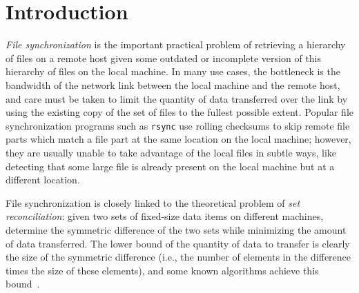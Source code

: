 \documentclass[twoside,envcountsame,runningheads]{llncs}
\newcommand{\rsync}{\texttt{rsync}\xspace}
\begin{document}

\section{Introduction}

\emph{File synchronization} is the important practical problem of
retrieving a hierarchy of files on a remote host given some outdated or
incomplete version of this hierarchy of files on the local machine. In many use
cases, the bottleneck is the bandwidth of the network link between the local machine
and the remote host, and care must be taken to limit the quantity of data
transferred over the link by using the existing copy of the set of files to the
fullest possible extent. Popular file synchronization programs such as \rsync
use rolling checksums to skip remote file parts which match a file part at the
same location on the local machine; however, they are usually unable to take
advantage of the local files in subtle ways, like detecting that some large file
is already present on the local machine but at a different location.

File synchronization is closely linked to the theoretical problem of \emph{set
reconciliation}: given two sets of fixed-size data items on different machines,
determine the symmetric difference of the two sets while minimizing the amount
of data transferred. The lower bound of the quantity of data to transfer is
clearly the size of the symmetric difference (i.e., the number of elements in the
difference times the size of these elements), and some known algorithms achieve
this bound~\cite{PSRec}.
\end{document}
